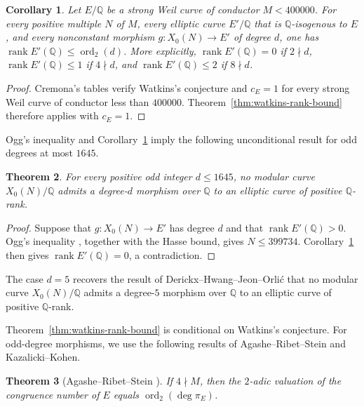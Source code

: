 \documentclass[12pt, letterpaper]{amsart}
\newtheorem{theorem}{Theorem}[section]
\newtheorem{corollary}[theorem]{Corollary}
\theoremstyle{definition}
\theoremstyle{remark}
\newcommand{\Q}{\mathbb Q}
\DeclareMathOperator{\ord}{ord}
\numberwithin{equation}{section}
\begin{document}
\begin{corollary}\label{cor:cremona-rank-bound}
Let \(E/\Q\) be a strong Weil curve of conductor \(M<400000\). For every
positive multiple \(N\) of \(M\), every elliptic curve \(E'/\Q\) that is
\(\Q\)-isogenous to \(E\), and every nonconstant morphism
\(g:X_0(N)\to E'\) of degree \(d\), one has
\(\operatorname{rank}E'(\Q)\leq\ord_2(d)\).
More explicitly, \(\operatorname{rank}E'(\Q)=0\) if \(2\nmid d\),
\(\operatorname{rank}E'(\Q)\leq1\) if \(4\nmid d\), and
\(\operatorname{rank}E'(\Q)\leq2\) if \(8\nmid d\).
\end{corollary}

\begin{proof}
Cremona's tables \cite{CremonaData} verify Watkins's conjecture
and \(c_E=1\) for every strong Weil curve of conductor less than
\(400000\). Theorem~\ref{thm:watkins-rank-bound} therefore applies with
\(c_E=1\).
\end{proof}

Ogg's inequality and Corollary~\ref{cor:cremona-rank-bound} imply the following
unconditional result for odd degrees at most \(1645\).

\begin{theorem}\label{thm:ogg-rank-bound}
For every positive odd integer \(d\leq1645\), no modular curve
\(X_0(N)/\Q\) admits a degree-\(d\) morphism over \(\Q\) to an elliptic curve
of positive \(\Q\)-rank.
\end{theorem}

\begin{proof}
Suppose that \(g:X_0(N)\to E'\) has degree \(d\) and that
\(\operatorname{rank}E'(\Q)>0\). Ogg's inequality \cite{OggHyperelliptic},
together with the Hasse bound, gives \(N\leq399734\). Corollary~\ref{cor:cremona-rank-bound}
then gives \(\operatorname{rank}E'(\Q)=0\), a contradiction.
\end{proof}

The case \(d=5\) recovers the result of
Derickx--Hwang--Jeon--Orli\'c \cite{DerickxHwangJeonOrlic} that no modular
curve \(X_0(N)/\Q\) admits a degree-\(5\) morphism over \(\Q\) to an elliptic
curve of positive \(\Q\)-rank.

Theorem~\ref{thm:watkins-rank-bound} is conditional on Watkins's conjecture.
For odd-degree morphisms, we use the following results of
Agashe--Ribet--Stein and Kazalicki--Kohen.

\begin{theorem}[Agashe--Ribet--Stein
\cite{AgasheRibetSteinCongruence}]
\label{thm:congruence-modular-parity}
If \(4\nmid M\), then the \(2\)-adic valuation of the congruence number of
\(E\) equals \(\ord_2(\deg\pi_E)\).
\end{theorem}
\end{document}
